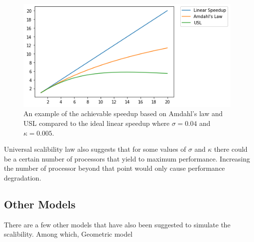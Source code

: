 \begin{figure}[H]
	\centering
	\includegraphics[width=1\linewidth]{images/Amdahls.png}
	\caption{An example of the achievable speedup based on Amdahl's law and USL compared to the ideal linear speedup where $\sigma=0.04$ and $\kappa=0.005$.}	
	\label{fig_Amdahl}
\end{figure}

Universal scalibility law also suggests that for some values of $\sigma$ and $\kappa$ there could be a certain number of processors that yield to maximum performance\cite{gunther2007guerrilla}. Increasing the number of processor beyond that point would only cause performance degradation.  

\vspace{\baselineskip}
\subsection{Other Models}	
There are a few other models that have also been suggested to simulate the scalibility. Among which, Geometric model 
